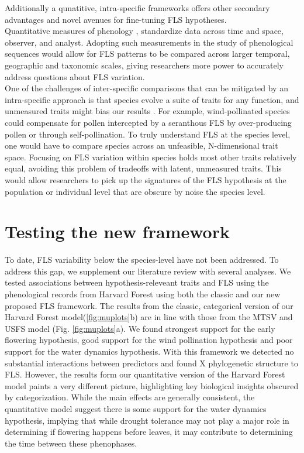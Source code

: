 \documentclass{article}
\begin{document}
Additionally a qunatitive, intra-specific frameworks offers other secondary advantages and novel avenues for fine-tuning FLS hypotheses.\\

Quantitative measures of phenology \citep[e.g. the BBCH scale,][]{Finn2007}, standardize data across time and space, observer, and analyst. Adopting such measurements in the study of phenological sequences would allow for FLS patterns to be compared across larger temporal, geographic and taxonomic scales, giving researchers more power to accurately address questions about FLS variation.\\
 
One of the challenges of inter-specific comparisons that can be mitigated by an intra-specific approach is that species evolve a suite of traits for any function, and unmeasured traits might bias our results \citep{Davies2019}. For example, wind-pollinated species could compensate for pollen intercepted by a seranthous FLS by over-producing pollen or through self-pollination. To truly understand FLS at the species level, one would have to compare species across an unfeasible, N-dimensional trait space. Focusing on FLS variation within species holds most other traits relatively equal, avoiding this problem of tradeoffs with latent, unmeasured traits. This would allow researchers to pick up the signatures of the FLS hypothesis at the population or individual level that are obscure by noise the species level.\\



\section*{Testing the new framework}
To date, FLS variability below the species-level have not been addressed. To address this gap, we supplement our literature review with several analyses. We tested associations between hypothesis-releveant traits and FLS using the phenological records from Harvard Forest using both the classic and our new proposed FLS framework. The results from the classic, categorical version of our Harvard Forest model(\ref{fig:muplots}b) are in line with those from the MTSV and USFS model (Fig. \ref{fig:muplots}a). We found strongest support for the early flowering hypothesis, good support for the wind pollination hypothesis and poor support for the water dynamics hypothesis. With this framework we detected no substantial interactions between predictors and found X phylogenetic structure to FLS. However, the results form our quantitative version of the Harvard Forest model paints a very different picture, highlighting key biological insights obscured by categorization. While the main effects are generally consistent, the quantitative model suggest there is some support for the water dynamics hypothesis, implying that while drought tolerance may not play a major role in determining if flowering happens before leaves, it may contribute to determining the time between these phenophases.\\
\end{document}
